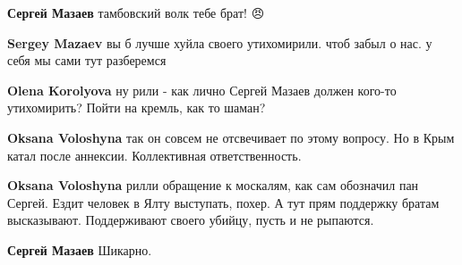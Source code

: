 \begin{itemize}
\textbf{Сергей Мазаев} тамбовский волк тебе брат! 😠

 
\textbf{Sergey Mazaev} вы б лучше хуйла своего утихомирили. чтоб забыл о нас. у себя мы сами тут разберемся

\begin{itemize}
 
\textbf{Olena Korolyova} ну рили - как лично Сергей Мазаев должен кого-то утихомирить? Пойти на кремль, как то шаман?

 
\textbf{Oksana Voloshyna} так он совсем не отсвечивает по этому вопросу. Но в Крым катал после аннексии. Коллективная ответственность.

 
\textbf{Oksana Voloshyna} рилли обращение к москалям, как сам обозначил пан Сергей. Ездит человек в Ялту выступать, похер. А тут прям поддержку братам высказывают. Поддерживают своего убийцу, пусть и не рыпаются.
\end{itemize}

 
\textbf{Сергей Мазаев} Шикарно.

 

\end{itemize}
